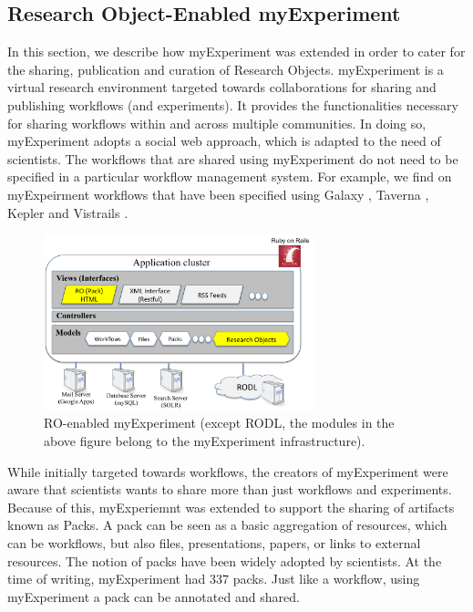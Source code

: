\subsection{Research Object-Enabled myExperiment}
\label{sec:myexperiment}


In this section, we describe how myExperiment \cite{DBLP:journals/fgcs/RoureGS09} was extended in order to cater for the sharing, publication and curation of Research Objects. myExperiment is a virtual research environment targeted towards collaborations for sharing and publishing workflows (and experiments). It provides the functionalities necessary for sharing workflows within and across multiple communities. In doing so, myExperiment adopts a social web approach, which is adapted to the need of scientists. The workflows that are shared using myExperiment do not need to be specified in a particular workflow management system. For example, we find on myExpeirment workflows that have been specified using Galaxy \cite{galaxy}, Taverna \cite{taverna}, Kepler \cite{kepler} and Vistrails \cite{vistrails}.

\begin{figure}
\begin{center}
\includegraphics[width=0.7\textwidth]{Figures/myexperimentArchitecture.png}
\end{center}
\caption{RO-enabled myExperiment (except RODL, the modules in the above figure belong to the myExperiment infrastructure).}
\label{fig:myexperimentarchitecture}
\end{figure}


While initially targeted towards workflows, the creators of myExperiment were aware that scientists wants to share more than just workflows and experiments. Because of this, myExperiemnt was extended to support the sharing of artifacts known as Packs. A pack can be seen as a basic aggregation of resources, which can be workflows, but also files, presentations, papers, or links to external resources. 
The notion of packs have been widely adopted by scientists. At the time of writing, myExperiment had $337$ packs. Just like a workflow, using myExperiment a pack can be annotated and shared. 
 
